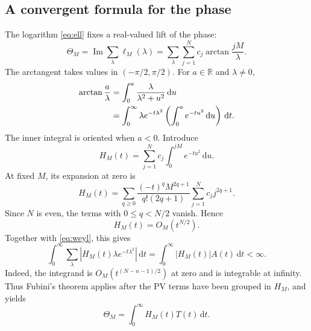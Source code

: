 \documentclass[11pt,a4paper]{article}
\theoremstyle{remark}
\newcommand{\dd}{\,\mathrm d}
\newcommand{\R}{\mathbb R}
\numberwithin{equation}{section}
\begin{document}
\subsection{A convergent formula for the phase}

The logarithm \eqref{eq:ell} fixes a real-valued lift of the phase:
\begin{equation}\label{eq:theta}
 \Theta_M=\operatorname{Im}\sum_\lambda\ell_M(\lambda)
 =\sum_\lambda\sum_{j=1}^Nc_j\arctan\frac{jM}{\lambda}.
\end{equation}
The arctangent takes values in $(-\pi/2,\pi/2)$.
For $a\in\R$ and $\lambda\ne0$,
\begin{align}\label{eq:arctan}
 \arctan\frac a\lambda
 &=\int_0^a\frac{\lambda}{\lambda^2+u^2}\dd u\notag\\
 &=\int_0^\infty\lambda e^{-t\lambda^2}
            \left(\int_0^a e^{-tu^2}\dd u\right)\dd t.
\end{align}
The inner integral is oriented when $a<0$.
Introduce
\begin{equation}\label{eq:H}
 H_M(t)=\sum_{j=1}^Nc_j\int_0^{jM}e^{-tu^2}\dd u.
\end{equation}
At fixed $M$, its expansion at zero is
\begin{equation}\label{eq:H-expansion}
 H_M(t)=\sum_{q\ge0}
 \frac{(-t)^qM^{2q+1}}{q!(2q+1)}\sum_{j=1}^Nc_jj^{2q+1}.
\end{equation}
Since $N$ is even, the terms with $0\le q<N/2$ vanish. Hence
\begin{equation}\label{eq:H-small}
 H_M(t)=O_M(t^{N/2}).
\end{equation}
Together with \eqref{eq:weyl}, this gives
\begin{equation}\label{eq:fubini}
 \int_0^\infty\sum_\lambda
 |H_M(t)\lambda e^{-t\lambda^2}|\dd t
 =\int_0^\infty |H_M(t)|A(t)\dd t<\infty.
\end{equation}
Indeed, the integrand is $O_M(t^{(N-n-1)/2})$ at zero and is
integrable at infinity. Thus Fubini's theorem applies after the PV
terms have been grouped in $H_M$, and yields
\begin{equation}\label{eq:theta-heat}
 \Theta_M=\int_0^\infty H_M(t)T(t)\dd t.
\end{equation}
\end{document}
